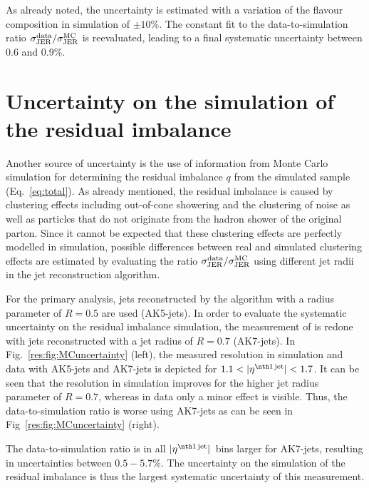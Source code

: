 As already noted, the uncertainty is estimated with a variation of the flavour composition in simulation of $\pm10\%$.
The constant fit to the data-to-simulation ratio $\sigma_\mathrm{JER}^{\text{data}}/\sigma_\mathrm{JER}^{\text{MC}}$ is reevaluated, leading to a final systematic uncertainty between 0.6 and 0.9\%.

\section*{Uncertainty on the simulation of the residual imbalance}
Another source of uncertainty is the use of information from Monte Carlo simulation for determining the residual imbalance $q$ from the simulated \GAMJET sample (Eq.~\eqref{eq:total}).
As already mentioned, the residual imbalance is caused by clustering effects including out-of-cone showering and the clustering of noise as well as particles that do not originate from the hadron shower of the original parton. 
Since it cannot be expected that these clustering effects are perfectly modelled in simulation, possible differences between real and simulated clustering effects are estimated by evaluating the ratio $\sigma_\mathrm{JER}^{\text{data}}/\sigma_\mathrm{JER}^{\text{MC}}$ using different jet radii in the jet reconstruction algorithm. 

For the primary analysis, jets reconstructed by the \antikt algorithm with a radius parameter of $R=0.5$ are used (AK5-jets). 
In order to evaluate the systematic uncertainty on the residual imbalance simulation, the measurement of \rhores is redone with jets reconstructed with a jet radius of $R=0.7$ (AK7-jets). 
In Fig.~\ref{res:fig:MCuncertainty} (left), the measured resolution in simulation and data with AK5-jets and AK7-jets is depicted for $1.1<|\etafirstjet|<1.7$.
It can be seen that the resolution in simulation improves for the higher jet radius parameter of $R=0.7$, whereas in data only a minor effect is visible.
Thus, the data-to-simulation ratio is worse using AK7-jets as can be seen in Fig~\ref{res:fig:MCuncertainty} (right).

The data-to-simulation ratio is in all $|\etafirstjet|$~bins larger for AK7-jets, resulting in uncertainties between $0.5-5.7\%$.
The uncertainty on the simulation of the residual imbalance is thus the largest systematic uncertainty of this measurement.


